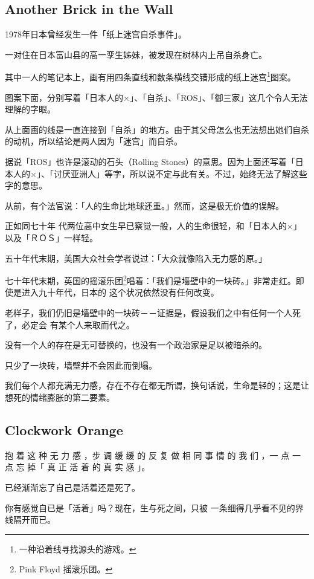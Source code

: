 \documentclass[UTF8]{ctexart}
\begin{document}
\subsection{Another Brick in the Wall}

1978年日本曾经发生一件「纸上迷宫自杀事件」。

一对住在日本富山县的高一孪生姊妹，被发现在树林内上吊自杀身亡。

其中一人的笔记本上，画有用四条直线和数条横线交错形成的纸上迷宫\footnote{一种沿着线寻找源头的游戏。}图案。

图案下面，分别写着「日本人的×」、「自杀」、「ROS」、「御三家」这几个令人无法理解的字眼。

从上面画的线是一直连接到「自杀」的地方。由于其父母怎么也无法想出她们自杀的动机，所以结论是两人因为「迷宫」而自杀。

据说「ROS」也许是滚动的石头（Rolling Stones）的意思。因为上面还写着「日本人的×」、「讨厌亚洲人」等字，所以说不定与此有关。不过，始终无法了解这些字的意思。

从前，有个法官说：「人的生命比地球还重。」然而，这是极无价值的误解。

正如同七十年 代两位高中女生早已察觉一般，人的生命很轻，和「日本人的×」以及「ＲＯＳ」一样轻。

五十年代末期，美国大众社会学者说过：「大众就像陷入无力感的原。」

七十年代末期，英国的摇滚乐团\footnote{Pink Floyd 摇滚乐团。}唱着：「我们是墙壁中的一块砖。」非常走红。即使是进入九十年代，日本的 这个状况依然没有任何改变。

老样子，我们仍旧是墙壁中的一块砖－－证据是，假设我们之中有任何一个人死了，必定会 有某个人来取而代之。

没有一个人的存在是无可替换的，也没有一个政治家是足以被暗杀的。 

只少了一块砖，墙壁并不会因此而倒塌。 

我们每个人都充满无力感，存在不存在都无所谓，换句话说，生命是轻的；这是让想死的情绪膨胀的第二要素。

\subsection{Clockwork Orange}

抱 着 这 种 无 力 感 ，步 调 缓 缓 的 反 复 做 相 同 事 情 的 我 们 ，一 点 一 点 忘 掉「 真 正 活 着 的 真 实 感 」。

已经渐渐忘了自己是活着还是死了。

你有感觉自已是「活着」吗？现在，生与死之间，只被 一条细得几乎看不见的界线隔开而已。
\end{document}
